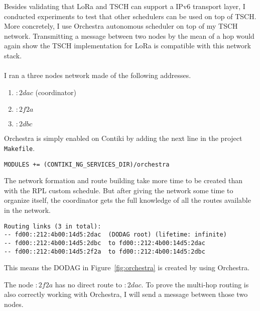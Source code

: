 Besides validating that LoRa and TSCH can support a IPv6 transport
layer, I conducted experiments to test that other schedulers can be used on top
of TSCH. More concretely, I use Orchestra autonomous scheduler on top of my TSCH network.
Transmitting a message between two nodes by the mean of a hop would again show
the TSCH implementation for LoRa is compatible with this network stack.

\paragraph{}

I ran a three nodes network made of the following addresses.

\begin{enumerate}
  \item $:2dac$ (coordinator)
  \item $:2f2a$
  \item $:2dbc$
\end{enumerate}

Orchestra is simply enabled on Contiki by adding the next line in the project
\lstinline{Makefile}.

\begin{lstlisting}
MODULES += (CONTIKI_NG_SERVICES_DIR)/orchestra
\end{lstlisting}

The network formation and route building take more time to be created than with
the RPL custom schedule.
But after giving the network some time to organize itself, the coordinator gets
the full knowledge of all the routes available in the network.

\begin{lstlisting}
Routing links (3 in total):
-- fd00::212:4b00:14d5:2dac  (DODAG root) (lifetime: infinite)
-- fd00::212:4b00:14d5:2dbc  to fd00::212:4b00:14d5:2dac
-- fd00::212:4b00:14d5:2f2a  to fd00::212:4b00:14d5:2dbc
\end{lstlisting}

This means the DODAG in Figure~\ref{fig:orchestra} is created by using Orchestra.



The node $:2f2a$ has no direct route to $:2dac$.
To prove the multi-hop routing is also correctly working with Orchestra, I will
send a message between those two nodes.

\paragraph{}

